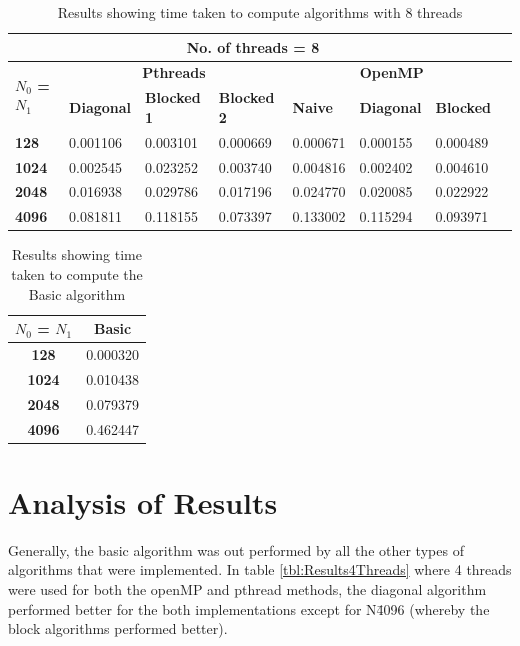 \documentclass[10pt, onecolumn]{article}
\begin{document}
\begin{table}[H]
    \vspace{-0.5cm}
    \centering
    \caption{Results showing time taken to compute algorithms with 8 threads}
    \label{tbl:Results8Threads}
    \begin{tabular}{|l|l|l|l|l|l|l|l|}
    \hline
     \multicolumn{7}{|c|}{\textbf{No. of threads = 8}} \\ \hline
    \multirow{2}{*}{\textbf{$N_0$ = $N_1$}} & \multicolumn{3}{c|}{\textbf{Pthreads}} & \multicolumn{3}{c|}{\textbf{OpenMP}} \\ \cline{2-7} 
    & \textbf{Diagonal} & \textbf{Blocked 1} & \textbf{Blocked 2} & \textbf{Naive} & \textbf{Diagonal} & \textbf{Blocked} \\ \hline
    \textbf{128}  &0.001106  &0.003101  &0.000669  &0.000671  &0.000155  &0.000489  \\ \hline
    \textbf{1024} &0.002545  &0.023252  &0.003740  &0.004816  &0.002402  &0.004610  \\ \hline
    \textbf{2048} &0.016938  &0.029786  &0.017196  &0.024770  &0.020085  &0.022922  \\ \hline
    \textbf{4096} &0.081811  &0.118155  &0.073397  &0.133002  &0.115294  &0.093971  \\ \hline
    \end{tabular}
\end{table}
%
\begin{table}[H]
    \vspace{-0.5cm}
    \centering
    \caption{Results showing time taken to compute the Basic algorithm}
    \label{tbl:Results8Threads}
    \begin{tabular}{|c|c|}
    \hline
    $N_0$ = $N_1$ & Basic \\ \hline
    \textbf{128}        &0.000320       \\ \hline
    \textbf{1024}       &0.010438       \\ \hline
    \textbf{2048}       &0.079379       \\ \hline
    \textbf{4096}       &0.462447       \\ \hline
    \end{tabular}
\end{table}
\section{Analysis of Results}
%
Generally, the basic algorithm was out performed by all the other types of algorithms that were implemented. In table \ref{tbl:Results4Threads} where 4 threads were used for both the openMP and pthread methods, the diagonal algorithm performed better for the both implementations except for N\= 4096 (whereby the block algorithms performed better).  
%
\end{document}
